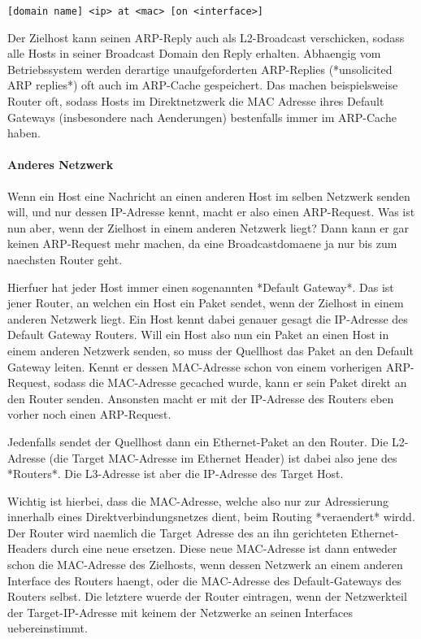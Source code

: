 \begin{verbatim}
[domain name] <ip> at <mac> [on <interface>]
\end{verbatim}

Der Zielhost kann seinen ARP-Reply auch als L2-Broadcast verschicken, sodass
alle Hosts in seiner Broadcast Domain den Reply erhalten. Abhaengig vom
Betriebssystem werden derartige unaufgeforderten ARP-Replies (*unsolicited ARP
replies*) oft auch im ARP-Cache gespeichert. Das machen beispielsweise Router
oft, sodass Hosts im Direktnetzwerk die MAC Adresse ihres Default Gateways
(insbesondere nach Aenderungen) bestenfalls immer im ARP-Cache haben.

\paragraph{Anderes Netzwerk} 

Wenn ein Host eine Nachricht an einen anderen Host im selben Netzwerk senden
will, und nur dessen IP-Adresse kennt, macht er also einen ARP-Request. Was ist
nun aber, wenn der Zielhost in einem anderen Netzwerk liegt? Dann kann er gar
keinen ARP-Request mehr machen, da eine Broadcastdomaene ja nur bis zum
naechsten Router geht.

Hierfuer hat jeder Host immer einen sogenannten *Default Gateway*. Das ist jener
Router, an welchen ein Host ein Paket sendet, wenn der Zielhost in einem anderen
Netzwerk liegt. Ein Host kennt dabei genauer gesagt die IP-Adresse des Default
Gateway Routers. Will ein Host also nun ein Paket an einen Host in einem anderen
Netzwerk senden, so muss der Quellhost das Paket an den Default Gateway
leiten. Kennt er dessen MAC-Adresse schon von einem vorherigen ARP-Request,
sodass die MAC-Adresse gecached wurde, kann er sein Paket direkt an den Router
senden. Ansonsten macht er mit der IP-Adresse des Routers eben vorher noch einen
ARP-Request.

Jedenfalls sendet der Quellhost dann ein Ethernet-Paket an den Router. Die
L2-Adresse (die Target MAC-Adresse im Ethernet Header) ist dabei also jene des
*Routers*. Die L3-Adresse ist aber die IP-Adresse des Target Host.

Wichtig ist hierbei, dass die MAC-Adresse, welche also nur zur Adressierung
innerhalb eines Direktverbindungsnetzes dient, beim Routing *veraendert*
wirdd. Der Router wird naemlich die Target Adresse des an ihn gerichteten
Ethernet-Headers durch eine neue ersetzen. Diese neue MAC-Adresse ist dann
entweder schon die MAC-Adresse des Zielhosts, wenn dessen Netzwerk an einem
anderen Interface des Routers haengt, oder die MAC-Adresse des Default-Gateways
des Routers selbst. Die letztere wuerde der Router eintragen, wenn der
Netzwerkteil der Target-IP-Adresse mit keinem der Netzwerke an seinen Interfaces
uebereinstimmt.

